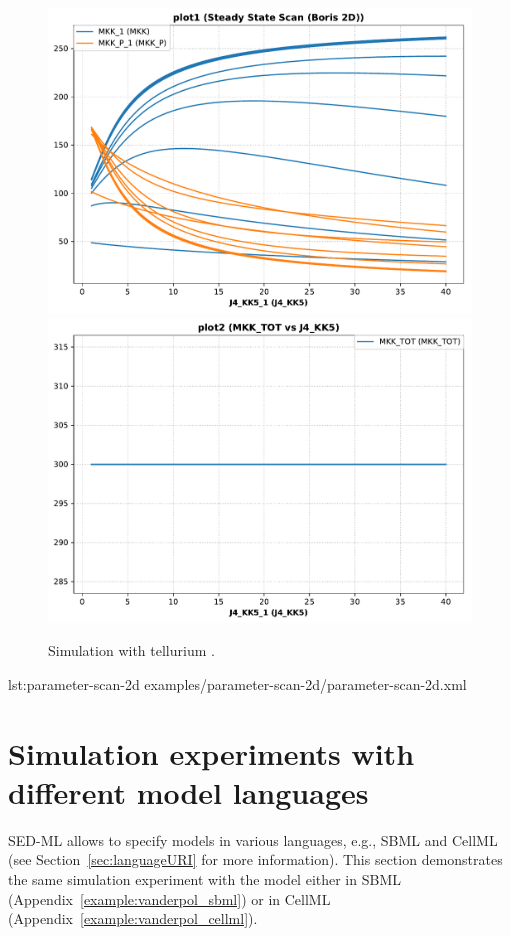 \begin{figure}[ht]
\begin{minipage}{0.47\textwidth}
        \includegraphics[width=1.0\textwidth]{examples/parameter-scan-2d/results/tellurium/plot1}
		\includegraphics[width=1.0\textwidth]{examples/parameter-scan-2d/results/tellurium/plot2}
        \caption{Simulation with tellurium \citep{tellurium}.}
    \end{minipage}
    \label{fig:parameter-scan-2d}
\end{figure}

{lst:parameter-scan-2d}
{examples/parameter-scan-2d/parameter-scan-2d.xml}

\pagebreak
\section{Simulation experiments with different model languages}
SED-ML allows to specify models in various languages, e.g., SBML \citep{Hucka:2003} and CellML \citep{cuellar:2003} (see Section~\ref{sec:languageURI} for more information). This section demonstrates the same simulation experiment with the model either in SBML (Appendix~\ref{example:vanderpol_sbml}) or in CellML (Appendix~\ref{example:vanderpol_cellml}).

